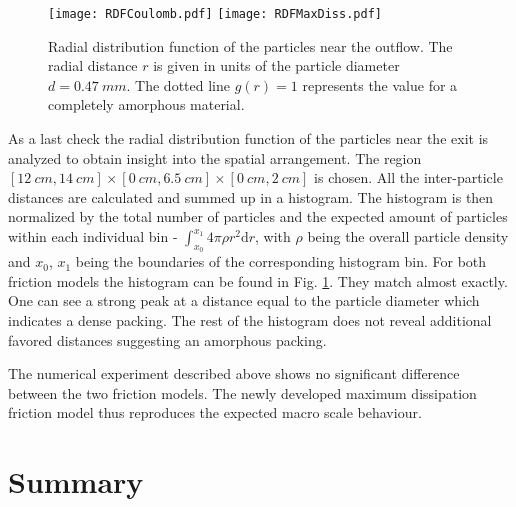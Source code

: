 \documentclass[global,twocolumn]{svjour}
\begin{document}
	\begin{figure}
		\texttt{[image: RDFCoulomb.pdf]}
		\texttt{[image: RDFMaxDiss.pdf]}
		\caption{Radial distribution function of the particles near the outflow. The radial distance $r$ is given in units of the particle diameter $d=\SI{0.47}{mm}$. The dotted line $g(r) = 1$ represents the value for a completely amorphous material.}
		\label{fig:RDF}
	\end{figure}
	
	As a last check the radial distribution function of the particles near the exit is analyzed to obtain insight into the spatial arrangement. The region $[\SI{12}{cm}, \SI{14}{cm}] \times [\SI{0}{cm}, \SI{6.5}{cm}] \times [\SI{0}{cm}, \SI{2}{cm}]$ is chosen. All the inter-particle distances are calculated and summed up in a histogram. The histogram is then normalized by the total number of particles and the expected amount of particles within each individual bin - $\int_{x_0}^{x_1}4\pi\rho r^2 \text{d}r$, with $\rho$ being the overall particle density and $x_0$, $x_1$ being the boundaries of the corresponding histogram bin. For both friction models the histogram can be found in Fig. \ref{fig:RDF}. They match almost exactly. One can see a strong peak at a distance equal to the particle diameter which indicates a dense packing. The rest of the histogram does not reveal additional favored distances suggesting an amorphous packing.

	The numerical experiment described above shows no significant difference between the two friction models. The newly developed maximum dissipation friction model thus reproduces the expected macro scale behaviour.

	\section{Summary}
	\label{sec:summary}
\end{document}
